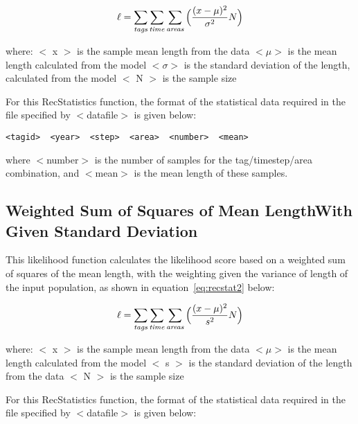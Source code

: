 \documentclass[10pt,twoside]{book}
\begin{document}
\begin{equation}\label{eq:recstat1}
\ell = \sum_{\it tags}\sum_{\it time}\sum_{\it areas} \Big(\frac{(x-\mu)^2} {\sigma^2} N\Big)
\end{equation}

where:\newline
$<$ x $>$ is the sample mean length from the data\newline
$<\mu>$ is the mean length calculated from the model\newline
$<\sigma>$ is the standard deviation of the length, calculated from the model\newline
$<$ N $>$ is the sample size

\bigskip
For this RecStatistics function, the format of the statistical data required in the file specified by $<$datafile$>$ is given below:

{\small\begin{verbatim}
<tagid>  <year>  <step>  <area>  <number>  <mean>
\end{verbatim}}

where $<$number$>$ is the number of samples for the tag/timestep/area combination, and $<$mean$>$ is the mean length of these samples.

\subsection{Weighted Sum of Squares of Mean Length\newline With Given Standard Deviation}
This likelihood function calculates the likelihood score based on a weighted sum of squares of the mean length, with the weighting given the variance of length of the input population, as shown in  equation~\ref{eq:recstat2} below:

\begin{equation}\label{eq:recstat2}
\ell = \sum_{\it tags}\sum_{\it time}\sum_{\it areas} \Big(\frac{(x-\mu)^2} {s^2} N\Big)
\end{equation}

where:\newline
$<$ x $>$ is the sample mean length from the data\newline
$<\mu>$ is the mean length calculated from the model\newline
$<$ s $>$ is the standard deviation of the length from the data\newline
$<$ N $>$ is the sample size

\bigskip
For this RecStatistics function, the format of the statistical data required in the file specified by $<$datafile$>$ is given below:
\end{document}
